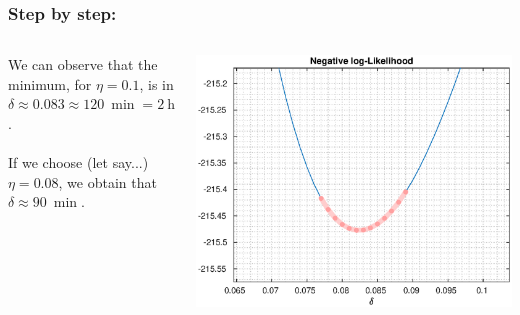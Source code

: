 \documentclass[aspectratio=169]{beamer}\usepackage[utf8]{inputenc}
\begin{document}
\begin{frame}\frametitle{Step by step:}

\begin{columns}[c]

We can observe that the minimum, for $\eta=0.1$, is in {\color{orange}$\delta\approx0.083\approx\SI{120}{\min}=\SI{2}{\hour}$}.\\
\quad\\
If we choose (let say...) $\eta=0.08$, we obtain that $\delta\approx\SI{90}{\min}$.

\includegraphics[width=1\textwidth]{../../MATLAB_Files/Results/delta/min.eps}

\end{columns}

\end{frame}
\end{document}
